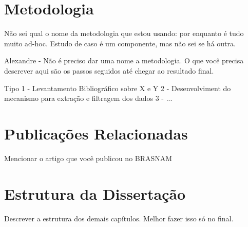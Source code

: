 \section{Metodologia}

Não sei qual o nome da metodologia que estou usando: por enquanto é tudo muito ad-hoc. Estudo de caso é um componente, mas não sei se há outra.

Alexandre -  Não é preciso dar uma nome a metodologia. O que você precisa descrever aqui são os passos seguidos até chegar ao resultado final.

Tipo
1 - Levantamento Bibliográfico sobre X e Y
2 - Desenvolviment do mecanismo para extração e filtragem dos dados
3 - ...

\section{Publicações Relacionadas}

Mencionar o artigo que você publicou no BRASNAM

\section{Estrutura da Dissertação}

Descrever a estrutura dos demais capítulos. Melhor fazer isso só no final.
